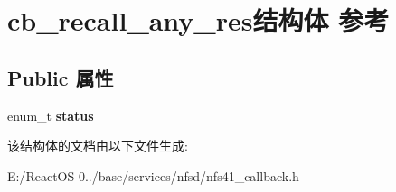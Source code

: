 \hypertarget{structcb__recall__any__res}{}\section{cb\+\_\+recall\+\_\+any\+\_\+res结构体 参考}
\label{structcb__recall__any__res}
\subsection*{Public 属性}
\begin{DoxyCompactItemize}
\item 
\mbox{\label{structcb__recall__any__res_a8f6ee2274c925734cc0b061e299b6434}} 
enum\+\_\+t {\bfseries status}
\end{DoxyCompactItemize}


该结构体的文档由以下文件生成\+:\begin{DoxyCompactItemize}
\item 
E\+:/\+React\+O\+S-\/0../base/services/nfsd/nfs41\+\_\+callback.\+h\end{DoxyCompactItemize}
